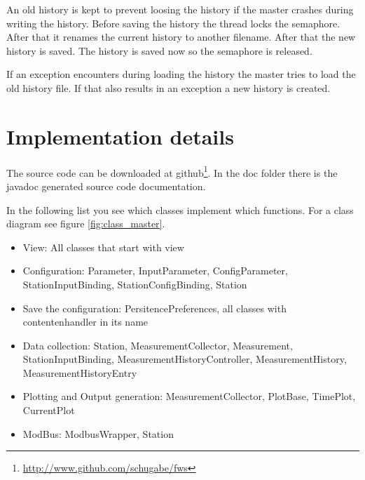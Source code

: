An old history is kept to prevent loosing the history if the master crashes during writing the history. Before saving the history the thread locks the semaphore. After that it renames the current history to another filename. After that the new history is saved. The history is saved now so the semaphore is released.

If an exception encounters during loading the history the master tries to load the old history file. If that also results in an exception a new history is created.

\section{Implementation details} %
\label{sec:implementation_details}
The source code can be downloaded at github\footnote{\url{http://www.github.com/schugabe/fws}}. In the doc folder there is the javadoc generated source code documentation.

In the following list you see which classes implement which functions. For a class diagram see figure \ref{fig:class_master}.

\begin{itemize}
    \item View: All classes that start with view
    \item Configuration: Parameter, InputParameter, ConfigParameter, StationInputBinding, StationConfigBinding, Station
    \item Save the configuration: PersitencePreferences, all classes with contentenhandler in its name
    \item Data collection: Station, MeasurementCollector, Measurement, StationInputBinding, MeasurementHistoryController, MeasurementHistory, MeasurementHistoryEntry
    \item Plotting and Output generation: MeasurementCollector, PlotBase, TimePlot, CurrentPlot
    \item ModBus: ModbusWrapper, Station
\end{itemize}

